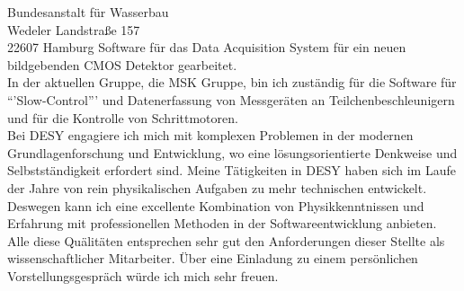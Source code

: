 \documentclass[ebner,paper=a4,fontsize=11pt,ngerman,BCOR=10mm]{scrlttr2}%
\begin{document}
\begin{letter}{Bundesanstalt f\"ur Wasserbau\\
Wedeler Landstra{\ss}e 157\\ 
22607 Hamburg}
Software f{\"u}r das Data Acquisition System f\"ur ein neuen bildgebenden CMOS
Detektor gearbeitet.\\
In der aktuellen Gruppe, die MSK Gruppe, bin ich zust{\"a}ndig f{\"u}r die
Software f{\"u}r ``'Slow-Control''' und Datenerfassung von Messger{\"a}ten an
Teilchenbeschleunigern und f{\"u}r die Kontrolle von Schrittmotoren.\\
\indent Bei DESY engagiere ich mich mit komplexen Problemen in der modernen
Grundlagenforschung und Entwicklung, wo eine l{\"o}sungsorientierte Denkweise
und Selbstst\"andigkeit erfordert sind. Meine T{\"a}tigkeiten in DESY haben sich
im Laufe der Jahre von rein physikalischen Aufgaben zu mehr technischen
entwickelt. Deswegen kann ich eine excellente Kombination von Physikkenntnissen
und Erfahrung mit professionellen Methoden in der Softwareentwicklung
anbieten.\\ 
\indent Alle diese Qu{\"a}lit{\"a}ten entsprechen sehr gut den Anforderungen
dieser Stellte als wissenschaftlicher Mitarbeiter. \"Uber eine Einladung zu
einem pers\"onlichen Vorstellungsgespr\"ach w\"urde ich mich sehr freuen.


\end{letter}
\end{document}
